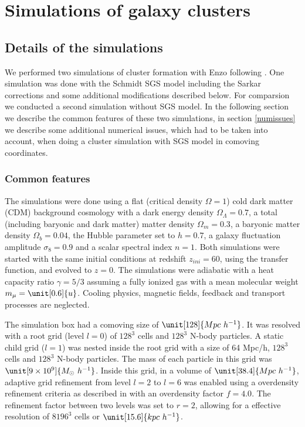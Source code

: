\chapter{Simulations of galaxy clusters}\label{clustersim}
\section{Details of the simulations}
We performed two simulations of cluster formation with Enzo following
\citet{Iapichino2008}. One simulation was done with the Schmidt SGS model
including the Sarkar corrections and some additional modifications described
below. For comparsion we conducted a second simulation without SGS model. In the
following section we describe the common features of these two simulations, in
section \ref{numissues} we describe some additional numerical issues, which had
to be taken into account, when doing a cluster simulation with SGS model in
comoving coordinates. 
\subsection{Common features}\label{common}
The simulations were done using a flat (critical density $\Omega=1$) cold dark
matter (CDM) background cosmology with a dark energy density
$\Omega_{\Lambda}=0.7$, a total (including baryonic and dark matter) matter
density $\Omega_{m}=0.3$, a baryonic matter density $\Omega_{b}=0.04$, the
Hubble parameter set to $h=0.7$, a galaxy fluctuation amplitude $\sigma_8=0.9$
and a scalar spectral index $n=1$. Both simulations were started with the same
initial conditions at redshift $z_{ini}=60$, using the \citet{Eisenstein1999}
transfer function, and evolved to $z=0$. The simulations were adiabatic with a
heat capacity ratio $\gamma=5/3$ assuming a fully ionized gas with a mean
molecular weight $m_{\mu}= \unit[0.6]{u}$. Cooling physics, magnetic fields,
feedback and transport processes are neglected. 

The simulation box had a comoving size of $\unit[128]{Mpc\ h^{-1}}$. It was
resolved with a root grid (level $l=0$) of $128^3$ cells and $128^3$ N-body
particles. A static child grid ($l=1$) was nested inside the root grid with a
size of 
64 Mpc/h, $128^3$ cells and $128^3$ N-body particles. The mass of each particle
in this grid was $\unit[9 \times 10^9]{M_{\odot}\ h^{-1}}$. Inside this grid, in
a volume of $\unit[38.4]{Mpc\ h^{-1}}$, adaptive grid refinement from level
$l=2$ to $l=6$ was enabled using a overdensity refinement criteria as described
in \citet{Iapichino2008} with an overdensity factor $f=4.0$. The refinement
factor between two levels was set to $r=2$, allowing for a effective resolution
of $8196^3$ cells or $\unit[15.6]{kpc\ h^{-1}}$.

